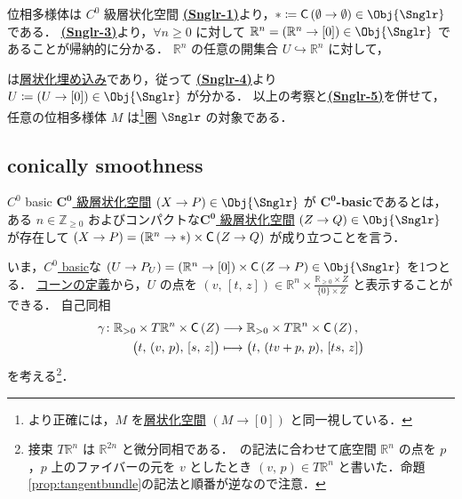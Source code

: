 \documentclass[TQFT_main]{subfiles}
\begin{document}
\begin{myexample}[label=ex:topomfld]{位相多様体は $C^0$ 級層状化空間}
    \hyperref[def:Snglr-C0]{\textsf{\textbf{(Snglr-1)}}}より，$* \coloneqq \Cone{\emptyset \to \emptyset} \in \Obj{\Snglr}$ である．
    \hyperref[def:Snglr-C0]{\textsf{\textbf{(Snglr-3)}}}より，$\forall n \ge 0$ に対して $\mathbb{R}^n = (\mathbb{R}^n \to [0]) \in \Obj{\Snglr}$ であることが帰納的に分かる．
    $\mathbb{R}^n$ の任意の開集合 $U \hookrightarrow \mathbb{R}^n$ に対して，
    \begin{center}
    \end{center}
    は\hyperref[def:strat-emb]{層状化埋め込み}であり，従って \hyperref[def:Snglr-C0]{\textsf{\textbf{(Snglr-4)}}}より $U \coloneqq (U \to [0]) \in \Obj{\Snglr}$ が分かる．
    以上の考察と\hyperref[def:Snglr-C0]{\textsf{\textbf{(Snglr-5)}}}を併せて，任意の位相多様体 $M$ は\footnote{より正確には，$M$ を\hyperref[def:stratified-space]{層状化空間} $(M \to [0])$ と同一視している．}圏 $\Snglr$ の対象である．
\end{myexample}

\subsection{conically smoothness}

\begin{mydef}[label=def:C0-basic]{$C^0$ basic}
    \hyperref[def:Snglr-C0]{$\bm{C^0}$ 級層状化空間} $(X \to P) \in \Obj{\Snglr}$ が $\bm{C^0}$\textbf{-basic}であるとは，ある $n \in \mathbb{Z}_{\ge 0}$ およびコンパクトな\hyperref[def:Snglr-C0]{$\bm{C^0}$ 級層状化空間} $(Z \to Q) \in \Obj{\Snglr}$ が存在して
    $(X \to P) = (\mathbb{R}^n \to *) \times \mathsf{C}\left( Z \to Q \right)$ が成り立つことを言う．
\end{mydef}

いま，\hyperref[def:C0-basic]{$C^0$ basic}な $(U \to P_U) = (\mathbb{R}^n \to [0]) \times \Cone{Z \to P} \in \Obj{\Snglr}$ を1つとる．
\hyperref[def:str-cone]{コーンの定義}から，$U$ の点を $(v,\, [t,\, z]) \in \mathbb{R}^n \times \frac{\mathbb{R}_{\ge 0} \times Z}{\{0\} \times Z}$ と表示することができる．
自己同相
\begin{align}
    \gamma \colon \mathbb{R}_{> 0} \times T \mathbb{R}^n \times \mathsf{C}\left( Z \right) &\longrightarrow \mathbb{R}_{> 0} \times T \mathbb{R}^n \times \mathsf{C}\left( Z \right), \\
    \bigl( t,\, (v,\, p),\, [s,\, z] \bigr) &\longmapsto \bigl( t,\, (tv + p,\, p),\, [ts,\, z] \bigr)
\end{align}
を考える\footnote{接束 $T\mathbb{R}^n$ は $\mathbb{R}^{2n}$ と微分同相である．~\cite[p.23]{AFT2014stratified}の記法に合わせて底空間 $\mathbb{R}^n$ の点を $p$，$p$ 上のファイバーの元を $v$ としたとき $(v,\, p) \in T \mathbb{R}^n$ と書いた．命題\ref{prop:tangentbundle}の記法と順番が逆なので注意．}．
\end{document}
